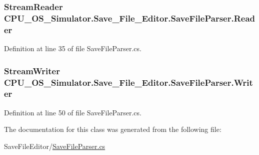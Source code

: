 \subsubsection[{Reader}]{\setlength{\rightskip}{0pt plus 5cm}Stream\+Reader C\+P\+U\+\_\+\+O\+S\+\_\+\+Simulator.\+Save\+\_\+\+File\+\_\+\+Editor.\+Save\+File\+Parser.\+Reader\hspace{0.3cm}{\ttfamily [get]}}\label{class_c_p_u___o_s___simulator_1_1_save___file___editor_1_1_save_file_parser_a25426185d4fb772b2525955e3003b25a}


Definition at line 35 of file Save\+File\+Parser.\+cs.

\hypertarget{class_c_p_u___o_s___simulator_1_1_save___file___editor_1_1_save_file_parser_aa0ae615cf418a985ccdc251f75e9f354}{}
\subsubsection[{Writer}]{\setlength{\rightskip}{0pt plus 5cm}Stream\+Writer C\+P\+U\+\_\+\+O\+S\+\_\+\+Simulator.\+Save\+\_\+\+File\+\_\+\+Editor.\+Save\+File\+Parser.\+Writer\hspace{0.3cm}{\ttfamily [get]}}\label{class_c_p_u___o_s___simulator_1_1_save___file___editor_1_1_save_file_parser_aa0ae615cf418a985ccdc251f75e9f354}


Definition at line 50 of file Save\+File\+Parser.\+cs.



The documentation for this class was generated from the following file\+:\begin{DoxyCompactItemize}
\item 
Save\+File\+Editor/\hyperlink{_save_file_parser_8cs}{Save\+File\+Parser.\+cs}\end{DoxyCompactItemize}

